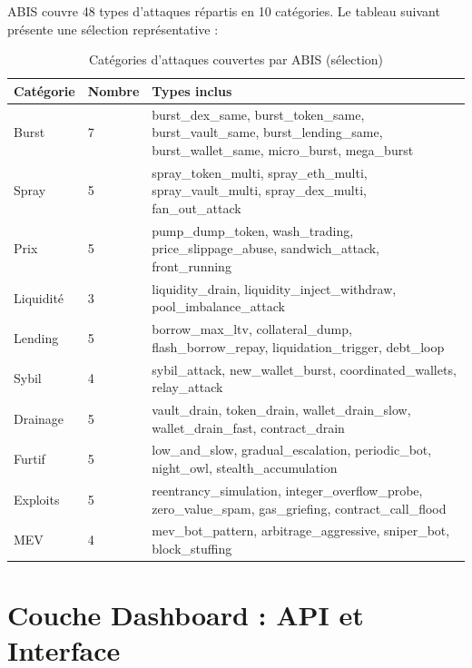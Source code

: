 \documentclass[12pt,a4paper]{report}
\begin{document}
ABIS couvre 48 types d'attaques répartis en 10 catégories. Le tableau suivant présente une sélection représentative :

\begin{table}[H]
\centering
\caption{Catégories d'attaques couvertes par ABIS (sélection)}
\label{tab:attack_categories}
\begin{tabularx}{\linewidth}{L{2.5cm} C{1.5cm} L{9cm}}
\toprule
\textbf{Catégorie} & \textbf{Nombre} & \textbf{Types inclus} \\
\midrule
Burst & 7 & burst\_dex\_same, burst\_token\_same, burst\_vault\_same, burst\_lending\_same, burst\_wallet\_same, micro\_burst, mega\_burst \\
Spray & 5 & spray\_token\_multi, spray\_eth\_multi, spray\_vault\_multi, spray\_dex\_multi, fan\_out\_attack \\
Prix & 5 & pump\_dump\_token, wash\_trading, price\_slippage\_abuse, sandwich\_attack, front\_running \\
Liquidité & 3 & liquidity\_drain, liquidity\_inject\_withdraw, pool\_imbalance\_attack \\
Lending & 5 & borrow\_max\_ltv, collateral\_dump, flash\_borrow\_repay, liquidation\_trigger, debt\_loop \\
Sybil & 4 & sybil\_attack, new\_wallet\_burst, coordinated\_wallets, relay\_attack \\
Drainage & 5 & vault\_drain, token\_drain, wallet\_drain\_slow, wallet\_drain\_fast, contract\_drain \\
Furtif & 5 & low\_and\_slow, gradual\_escalation, periodic\_bot, night\_owl, stealth\_accumulation \\
Exploits & 5 & reentrancy\_simulation, integer\_overflow\_probe, zero\_value\_spam, gas\_griefing, contract\_call\_flood \\
MEV & 4 & mev\_bot\_pattern, arbitrage\_aggressive, sniper\_bot, block\_stuffing \\
\bottomrule
\end{tabularx}
\end{table}

\chapter{Couche Dashboard : API et Interface}
\vspace{0pt}
\vspace{1cm}
\end{document}
